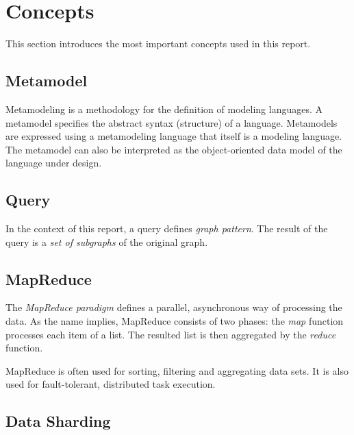 
\section{Concepts}

This section introduces the most important concepts used in this report. 

\subsection{Metamodel}

Metamodeling is a methodology for the definition of modeling languages. A metamodel specifies the abstract syntax (structure) of a language. Metamodels are expressed using a metamodeling language that itself is a modeling language. The metamodel can also be interpreted as the object-oriented data model of the language under design.

\subsection{Query}

In the context of this report, a query defines \emph{graph pattern}. The result of the query is a \emph{set of subgraphs} of the original graph.


\subsection{MapReduce}

The \emph{MapReduce paradigm} defines a parallel, asynchronous way of processing the data. As the name implies, MapReduce consists of two phases: the \emph{map} function processes each item of a list. The resulted list is then aggregated by the \emph{reduce} function.

MapReduce is often used for sorting, filtering and aggregating data sets. It is also used for fault-tolerant, distributed task execution.

\subsection{Data Sharding}

